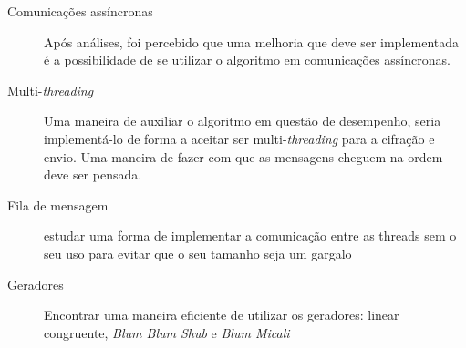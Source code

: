 	\begin{description}
		\item [Comunicações assíncronas] Após análises, foi percebido que uma melhoria que deve ser implementada é a possibilidade de se utilizar o algoritmo em comunicações assíncronas. 
		\item [Multi-\textit{threading}] Uma maneira de auxiliar o algoritmo em questão de desempenho, seria implementá-lo de forma a aceitar ser multi-\textit{threading} para a cifração e envio. Uma maneira de fazer com que as mensagens cheguem na ordem deve ser pensada.
		\item [Fila de mensagem] estudar uma forma de implementar a comunicação entre as threads sem o seu uso para evitar que o seu tamanho seja um gargalo
		\item [Geradores] Encontrar uma maneira eficiente de utilizar os geradores: linear congruente, \textit{Blum Blum Shub} e \textit{Blum Micali}
	\end{description}
	